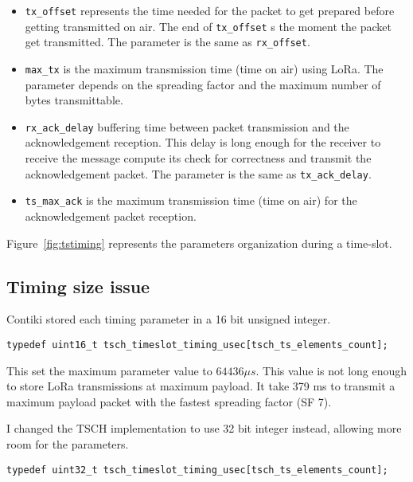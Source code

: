 \begin{itemize}
  \item \lstinline{tx_offset} represents the time needed for the packet to get
    prepared before getting transmitted on air. The end of
    \lstinline{tx_offset} s the moment the packet get transmitted. 
    The parameter is the same as \lstinline{rx_offset}.
  \item \lstinline{max_tx} is the maximum transmission time (time on air) using
    LoRa. The parameter depends on the spreading factor and the maximum number
    of bytes transmittable.
  \item \lstinline{rx_ack_delay} buffering time between packet transmission and
    the acknowledgement reception. This delay is long enough for the receiver
    to receive the message compute its check for correctness and transmit the acknowledgement packet.
    The parameter is the same as \lstinline{tx_ack_delay}.
  \item \lstinline{ts_max_ack} is the maximum transmission time (time on air) for
    the acknowledgement packet reception.
\end{itemize}

Figure~\ref{fig:tstiming} represents the parameters organization during
a time-slot.



\subsection{Timing size issue}

Contiki stored each timing parameter in a 16 bit unsigned integer.

\begin{lstlisting}
typedef uint16_t tsch_timeslot_timing_usec[tsch_ts_elements_count];
\end{lstlisting}

This set the maximum parameter value to $64436\mu s$.
This value is not long enough to store LoRa transmissions at maximum payload.
It take 379 ms to transmit a maximum payload packet with the fastest spreading
factor (SF 7).

I changed the TSCH implementation to use 32 bit integer instead, allowing more
room for the parameters.

\begin{lstlisting}
typedef uint32_t tsch_timeslot_timing_usec[tsch_ts_elements_count];
\end{lstlisting}

